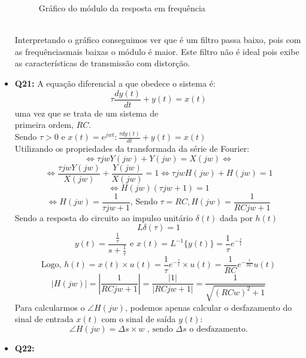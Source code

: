 \documentclass[a4paper, 12pt]{article}
\begin{document}
\begin{itemize}
\begin{figure}[!ht]
              \vspace{-10px}
              \caption{Gráfico do módulo da resposta em frequência}
          \end{figure}
          \\Interpretando o gráfico conseguimos ver que é um filtro passa baixo, pois com as frequênciasmais baixas o módulo é maior. Este filtro não é ideal pois exibe as características de transmissão com distorção.
    \item \textbf{Q21:} A equação diferencial a que obedece o sistema é:
          \[\tau\frac{dy(t)}{dt} + y(t) = x(t)\]
          uma vez que se trata de um sistema de\\
          primeira ordem, $RC$.\\
          Sendo $\tau>0$ e $x(t) = e^{jwt}: \frac{\tau dy(t)}{dt} + y(t) = x(t)$\\
          Utilizando os propriedades da transformada da série de Fourier:
          \[\Leftrightarrow \tau jwY(jw) + Y(jw) = X(jw)\Leftrightarrow\]
          \[\Leftrightarrow \frac{\tau jwY(jw)}{X(jw)} + \frac{Y(jw)}{X(jw)} = 1 \Leftrightarrow \tau jwH(jw) + H(jw) = 1\]
          \[\Leftrightarrow H(jw)(\tau jw + 1) = 1\]
          \[\Leftrightarrow H(jw) = \frac{1}{\tau jw + 1} \textrm{, Sendo } \tau = RC, H(jw) = \frac{1}{RCjw + 1}\]
          Sendo a resposta do circuito ao impulso unitário $\delta(t)$ dada por $h(t)$
          \[L\delta(\tau) = 1\]
          \[y(t) = \frac{\frac{1}{\tau}}{s + \frac{1}{\tau}} \textrm{ e } x(t) = L^{-1}\{y(t)\} = \frac{1}{\tau}e^{-\frac{\tau}{t}}\]
          \[\textrm{Logo, } h(t) = x(t)\times u(t) = \frac{1}{\tau}e^{-\frac{\tau}{t}} \times u(t) = \frac{1}{RC}e^{-\frac{t}{RC}}u(t)\]
          \[ |H(jw)| = |\frac{1}{RCjw + 1}| = \frac{|1|}{|RCjw +1|} = \frac{1}{\sqrt{{(RCw)}^{2} + 1}}\]
          Para calcularmos o $\angle H(jw)$, podemos apenas calcular o desfazamento do sinal de entrada $x(t)$ com o sinal de saída $y(t)$:
          \[\angle H(jw) = \Delta s \times w \textrm{ , sendo } \Delta s \textrm{ o desfazamento.}\]
    \item \textbf{Q22:}
\end{itemize}
\newpage
\end{document}
